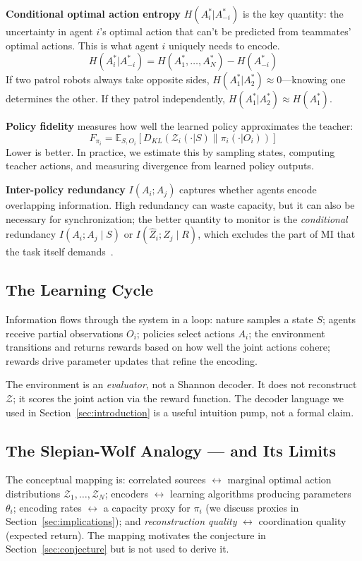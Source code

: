\documentclass[10pt, letterpaper]{article}
\begin{document}
\textbf{Conditional optimal action entropy} $H(A_i^*|A_{-i}^*)$ is the key quantity: the uncertainty in agent $i$'s optimal action that can't be predicted from teammates' optimal actions. This is what agent $i$ uniquely needs to encode.
\[H(A_i^*|A_{-i}^*) = H(A_1^*, \ldots, A_N^*) - H(A_{-i}^*)\]
If two patrol robots always take opposite sides, $H(A_1^*|A_2^*) \approx 0$---knowing one determines the other. If they patrol independently, $H(A_1^*|A_2^*) \approx H(A_1^*)$.

\textbf{Policy fidelity} measures how well the learned policy approximates the teacher:
\[F_{\pi_i} = \mathbb{E}_{S, O_i} \left[ D_{KL}(\mathcal{Z}_i(\cdot|S) \| \pi_i(\cdot|O_i)) \right]\]
Lower is better. In practice, we estimate this by sampling states, computing teacher actions, and measuring divergence from learned policy outputs.

\textbf{Inter-policy redundancy} $I(A_i; A_j)$ captures whether agents encode overlapping information. High redundancy can waste capacity, but it can also be necessary for synchronization; the better quantity to monitor is the \emph{conditional} redundancy $I(A_i; A_j \mid S)$ or $I(\hat{Z}_i; \hat{Z}_j \mid R)$, which excludes the part of MI that the task itself demands~\cite{li2022pmic,fischer2020ceb}.

\subsection{The Learning Cycle}

Information flows through the system in a loop: nature samples a state $S$; agents receive partial observations $O_i$; policies select actions $A_i$; the environment transitions and returns rewards based on how well the joint actions cohere; rewards drive parameter updates that refine the encoding.

The environment is an \emph{evaluator}, not a Shannon decoder. It does not reconstruct $\mathcal{Z}$; it scores the joint action via the reward function. The decoder language we used in Section~\ref{sec:introduction} is a useful intuition pump, not a formal claim.

\subsection{The Slepian-Wolf Analogy --- and Its Limits}
\label{sec:sw-analogy}

The conceptual mapping is: correlated sources $\leftrightarrow$ marginal optimal action distributions $\mathcal{Z}_1, \ldots, \mathcal{Z}_N$; encoders $\leftrightarrow$ learning algorithms producing parameters $\theta_i$; encoding rates $\leftrightarrow$ a capacity proxy for $\pi_i$ (we discuss proxies in Section~\ref{sec:implications}); and \emph{reconstruction quality} $\leftrightarrow$ coordination quality (expected return). The mapping motivates the conjecture in Section~\ref{sec:conjecture} but is not used to derive it.
\end{document}
